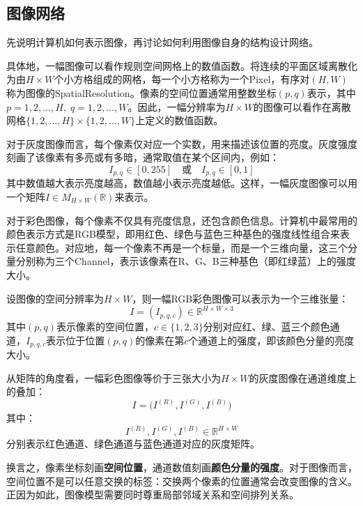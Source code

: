 \subsection{图像网络}
先说明计算机如何表示图像，再讨论如何利用图像自身的结构设计网络。\par
具体地，一幅图像可以看作规则空间网格上的数值函数。将连续的平面区域离散化为由$H\times W$个小方格组成的网格，每一个小方格称为一个\gls{Pixel}，有序对$(H,W)$称为图像的\gls{SpatialResolution}。像素的空间位置通常用整数坐标$(p,q)$表示，其中$p=1,2,\dots,H,\;q=1,2,\dots,W$。因此，一幅分辨率为$H\times W$的图像可以看作在离散网格$\{1,2,\dots,H\}\times\{1,2,\dots,W\}$上定义的数值函数。\par
对于灰度图像而言，每个像素仅对应一个实数，用来描述该位置的亮度。灰度强度刻画了该像素有多亮或有多暗，通常取值在某个区间内，例如：
\begin{equation*}
	I_{p,q}\in[0,255]\quad\text{或}\quad I_{p,q}\in[0,1]
\end{equation*}
其中数值越大表示亮度越高，数值越小表示亮度越低。这样，一幅灰度图像可以用一个矩阵$I\in M_{H\times W}(\mathbb{R})$来表示。\par
对于彩色图像，每个像素不仅具有亮度信息，还包含颜色信息。计算机中最常用的颜色表示方式是RGB模型，即用红色、绿色与蓝色三种基色的强度线性组合来表示任意颜色。对应地，每一个像素不再是一个标量，而是一个三维向量，这三个分量分别称为三个\gls{Channel}，表示该像素在R、G、B三种基色（即红绿蓝）上的强度大小。\par
设图像的空间分辨率为$H\times W$，则一幅RGB彩色图像可以表示为一个三维张量：
\begin{equation*}
	I=(I_{p,q,c})\in\mathbb{R}^{H\times W\times3}
\end{equation*}
其中$(p,q)$表示像素的空间位置，$c\in\{1,2,3\}$分别对应红、绿、蓝三个颜色通道，$I_{p,q,c}$表示位于位置$(p,q)$的像素在第$c$个通道上的强度，即该颜色分量的亮度大小。\par
从矩阵的角度看，一幅彩色图像等价于三张大小为$H\times W$的灰度图像在通道维度上的叠加：
\begin{equation*}
	I=\big(I^{(R)},I^{(G)},I^{(B)}\big)
\end{equation*}
其中：
\begin{equation*}
	I^{(R)},I^{(G)},I^{(B)}\in\mathbb{R}^{H\times W}
\end{equation*}
分别表示红色通道、绿色通道与蓝色通道对应的灰度矩阵。\par
换言之，像素坐标刻画\textbf{空间位置}，通道数值刻画\textbf{颜色分量的强度}。对于图像而言，空间位置不是可以任意交换的标签：交换两个像素的位置通常会改变图像的含义。正因为如此，图像模型需要同时尊重局部邻域关系和空间排列关系。
